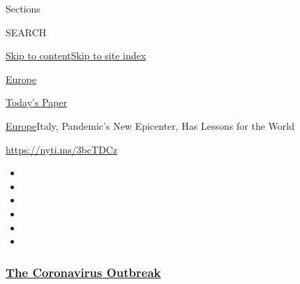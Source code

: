 Sections

SEARCH

\protect\hyperlink{site-content}{Skip to
content}\protect\hyperlink{site-index}{Skip to site index}

\href{https://www.nytimes3xbfgragh.onion/section/world/europe}{Europe}

\href{https://myaccount.nytimes3xbfgragh.onion/auth/login?response_type=cookie\&client_id=vi}{}

\href{https://www.nytimes3xbfgragh.onion/section/todayspaper}{Today's
Paper}

\href{/section/world/europe}{Europe}\textbar{}Italy, Pandemic's New
Epicenter, Has Lessons for the World

\url{https://nyti.ms/3bcTDCz}

\begin{itemize}
\item
\item
\item
\item
\item
\item
\end{itemize}

\hypertarget{the-coronavirus-outbreak}{%
\subsubsection{\texorpdfstring{\href{https://www.nytimes3xbfgragh.onion/news-event/coronavirus?name=styln-coronavirus-national\&region=TOP_BANNER\&block=storyline_menu_recirc\&action=click\&pgtype=Article\&impression_id=2bf985f0-efba-11ea-80ca-fdfa1d63f0db\&variant=undefined}{The
Coronavirus
Outbreak}}{The Coronavirus Outbreak}}\label{the-coronavirus-outbreak}}

